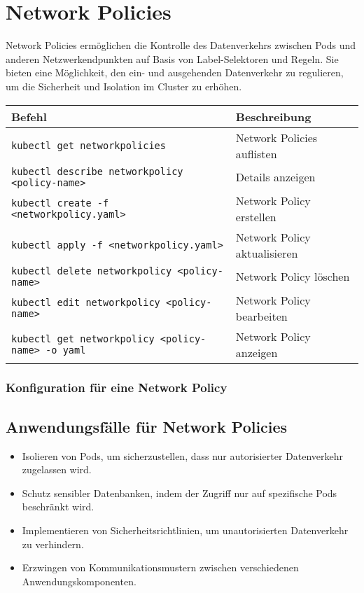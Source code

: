 \section{Network Policies}
Network Policies ermöglichen die Kontrolle des Datenverkehrs zwischen Pods und anderen Netzwerkendpunkten auf Basis von Label-Selektoren und Regeln. Sie bieten eine Möglichkeit, den ein- und ausgehenden Datenverkehr zu regulieren, um die Sicherheit und Isolation im Cluster zu erhöhen. \\

\noindent
\begin{tabular}{
|p{}|p{}|}
\hline
\textbf{Befehl} & \textbf{Beschreibung} \\
\hline
\texttt{kubectl get networkpolicies} & Network Policies auflisten \\
\texttt{kubectl describe networkpolicy <policy-name>} & Details  anzeigen \\
\texttt{kubectl create -f <networkpolicy.yaml>} & Network Policy erstellen \\
\texttt{kubectl apply -f <networkpolicy.yaml>} & Network Policy aktualisieren\\
\texttt{kubectl delete networkpolicy <policy-name>} & Network Policy löschen \\
\texttt{kubectl edit networkpolicy <policy-name>} & Network Policy bearbeiten \\
\texttt{kubectl get networkpolicy <policy-name> -o yaml} & Network Policy anzeigen \\
\hline
\end{tabular}

\subsubsection{Konfiguration für eine Network Policy}

\newpage
\subsection{Anwendungsfälle für Network Policies}
\begin{itemize}
    \item Isolieren von Pods, um sicherzustellen, dass nur autorisierter Datenverkehr zugelassen wird.
    \item Schutz sensibler Datenbanken, indem der Zugriff nur auf spezifische Pods beschränkt wird.
    \item Implementieren von Sicherheitsrichtlinien, um unautorisierten Datenverkehr zu verhindern.
    \item Erzwingen von Kommunikationsmustern zwischen verschiedenen Anwendungskomponenten.
\end{itemize}

